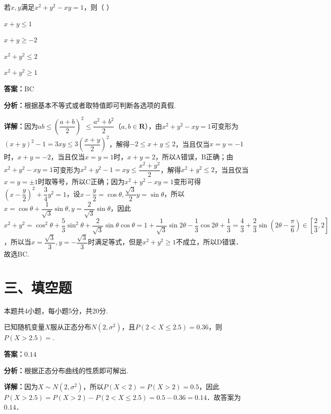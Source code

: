 \begin{question}[points=5]
若$x,y$满足$x^2+y^2-xy=1$，则（ ）
\begin{choices}
  \item $x+y\leq 1$
  \item $x+y\geq -2$
  \item $x^2+y^2\leq 2$
  \item $x^2+y^2\geq 1$
\end{choices}
\begin{solution}
\textbf{答案：}BC

\textbf{分析：}根据基本不等式或者取特值即可判断各选项的真假.

\textbf{详解：}因为$ab\leq\left(\dfrac{a+b}{2}\right)^2\leq\dfrac{a^2+b^2}{2}$（$a,b\in\mathbf{R}$），由$x^2+y^2-xy=1$可变形为$(x+y)^2-1=3xy\leq 3\left(\dfrac{x+y}{2}\right)^2$，解得$-2\leq x+y\leq 2$，当且仅当$x=y=-1$时，$x+y=-2$，当且仅当$x=y=1$时，$x+y=2$，所以A错误，B正确；由$x^2+y^2-xy=1$可变形为$x^2+y^2-1=xy\leq\dfrac{x^2+y^2}{2}$，解得$x^2+y^2\leq 2$，当且仅当$x=y=\pm1$时取等号，所以C正确；因为$x^2+y^2-xy=1$变形可得$\left(x-\dfrac{y}{2}\right)^2+\dfrac{3}{4}y^2=1$，设$x-\dfrac{y}{2}=\cos\theta,\dfrac{\sqrt{3}}{2}y=\sin\theta$，所以$x=\cos\theta+\dfrac{1}{\sqrt{3}}\sin\theta,y=\dfrac{2}{\sqrt{3}}\sin\theta$，因此$x^2+y^2=\cos^2\theta+\dfrac{5}{3}\sin^2\theta+\dfrac{2}{\sqrt{3}}\sin\theta\cos\theta=1+\dfrac{1}{\sqrt{3}}\sin2\theta-\dfrac{1}{3}\cos2\theta+\dfrac{1}{3}=\dfrac{4}{3}+\dfrac{2}{3}\sin\left(2\theta-\dfrac{\pi}{6}\right)\in\left[\dfrac{2}{3},2\right]$，所以当$x=\dfrac{\sqrt{3}}{3},y=-\dfrac{\sqrt{3}}{3}$时满足等式，但是$x^2+y^2\geq 1$不成立，所以D错误．故选BC.
\end{solution}
\end{question}

\section*{三、填空题}
本题共4小题，每小题5分，共20分.

\begin{question}[points=5]
已知随机变量$X$服从正态分布$N(2,\sigma^2)$，且$P(2<X\leq 2.5)=0.36$，则$P(X>2.5)=$.
\fillin[{$0.14$}]
\begin{solution}
\textbf{答案：}$0.14$

\textbf{分析：}根据正态分布曲线的性质即可解出.

\textbf{详解：}因为$X\sim N(2,\sigma^2)$，所以$P(X<2)=P(X>2)=0.5$，因此$P(X>2.5)=P(X>2)-P(2<X\leq 2.5)=0.5-0.36=0.14$．故答案为$0.14$．
\end{solution}
\end{question}

